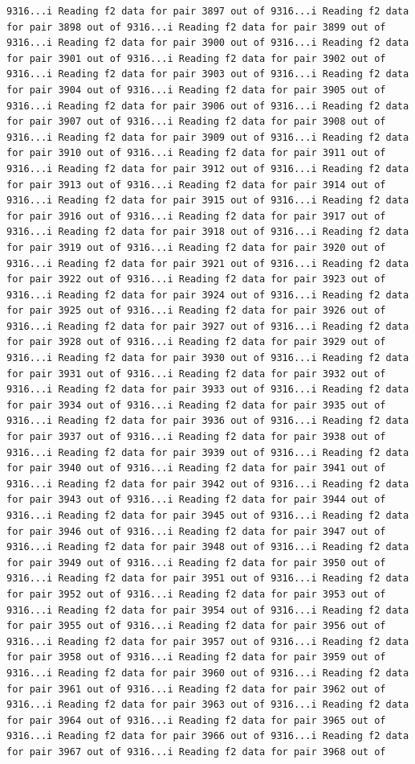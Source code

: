 \documentclass[
]{article}
\begin{document}
\begin{verbatim}
9316...i Reading f2 data for pair 3897 out of 9316...i Reading f2 data for pair 3898 out of 9316...i Reading f2 data for pair 3899 out of 9316...i Reading f2 data for pair 3900 out of 9316...i Reading f2 data for pair 3901 out of 9316...i Reading f2 data for pair 3902 out of 9316...i Reading f2 data for pair 3903 out of 9316...i Reading f2 data for pair 3904 out of 9316...i Reading f2 data for pair 3905 out of 9316...i Reading f2 data for pair 3906 out of 9316...i Reading f2 data for pair 3907 out of 9316...i Reading f2 data for pair 3908 out of 9316...i Reading f2 data for pair 3909 out of 9316...i Reading f2 data for pair 3910 out of 9316...i Reading f2 data for pair 3911 out of 9316...i Reading f2 data for pair 3912 out of 9316...i Reading f2 data for pair 3913 out of 9316...i Reading f2 data for pair 3914 out of 9316...i Reading f2 data for pair 3915 out of 9316...i Reading f2 data for pair 3916 out of 9316...i Reading f2 data for pair 3917 out of 9316...i Reading f2 data for pair 3918 out of 9316...i Reading f2 data for pair 3919 out of 9316...i Reading f2 data for pair 3920 out of 9316...i Reading f2 data for pair 3921 out of 9316...i Reading f2 data for pair 3922 out of 9316...i Reading f2 data for pair 3923 out of 9316...i Reading f2 data for pair 3924 out of 9316...i Reading f2 data for pair 3925 out of 9316...i Reading f2 data for pair 3926 out of 9316...i Reading f2 data for pair 3927 out of 9316...i Reading f2 data for pair 3928 out of 9316...i Reading f2 data for pair 3929 out of 9316...i Reading f2 data for pair 3930 out of 9316...i Reading f2 data for pair 3931 out of 9316...i Reading f2 data for pair 3932 out of 9316...i Reading f2 data for pair 3933 out of 9316...i Reading f2 data for pair 3934 out of 9316...i Reading f2 data for pair 3935 out of 9316...i Reading f2 data for pair 3936 out of 9316...i Reading f2 data for pair 3937 out of 9316...i Reading f2 data for pair 3938 out of 9316...i Reading f2 data for pair 3939 out of 9316...i Reading f2 data for pair 3940 out of 9316...i Reading f2 data for pair 3941 out of 9316...i Reading f2 data for pair 3942 out of 9316...i Reading f2 data for pair 3943 out of 9316...i Reading f2 data for pair 3944 out of 9316...i Reading f2 data for pair 3945 out of 9316...i Reading f2 data for pair 3946 out of 9316...i Reading f2 data for pair 3947 out of 9316...i Reading f2 data for pair 3948 out of 9316...i Reading f2 data for pair 3949 out of 9316...i Reading f2 data for pair 3950 out of 9316...i Reading f2 data for pair 3951 out of 9316...i Reading f2 data for pair 3952 out of 9316...i Reading f2 data for pair 3953 out of 9316...i Reading f2 data for pair 3954 out of 9316...i Reading f2 data for pair 3955 out of 9316...i Reading f2 data for pair 3956 out of 9316...i Reading f2 data for pair 3957 out of 9316...i Reading f2 data for pair 3958 out of 9316...i Reading f2 data for pair 3959 out of 9316...i Reading f2 data for pair 3960 out of 9316...i Reading f2 data for pair 3961 out of 9316...i Reading f2 data for pair 3962 out of 9316...i Reading f2 data for pair 3963 out of 9316...i Reading f2 data for pair 3964 out of 9316...i Reading f2 data for pair 3965 out of 9316...i Reading f2 data for pair 3966 out of 9316...i Reading f2 data for pair 3967 out of 9316...i Reading f2 data for pair 3968 out of 
\end{verbatim}
\end{document}
